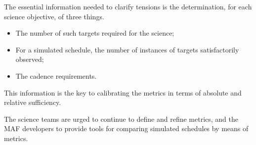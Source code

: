 The essential information needed to clarify tensions is the
determination, for each science objective, of three things.
\begin{itemize}
	\item The number of such targets required for the science;
	\item For a simulated schedule, the number of instances of targets satisfactorily observed;
	\item The cadence requirements.
\end{itemize}
This information is the key to calibrating the metrics in terms of
absolute and relative  sufficiency.

The science teams are urged to continue to define and refine metrics, and the MAF developers to provide
tools for comparing simulated schedules by means of metrics.


